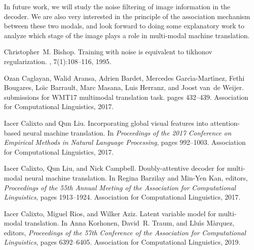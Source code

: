 \documentclass{article}
\begin{document}
In future work, we will study the noise filtering of image information in the decoder. We are also very interested in the principle of the association mechanism between these two modals, and look forward to doing some explanatory work to analyze which stage of the image plays a role in multi-modal machine translation.



\clearpage

\begin{thebibliography}{}

Christopher~M. Bishop.
\newblock Training with noise is equivalent to tikhonov regularization.
, 7(1):108--116, 1995.

Ozan Caglayan, Walid Aransa, Adrien Bardet, Mercedes
  Garc{\'{\i}}a{-}Mart{\'{\i}}nez, Fethi Bougares, Lo{\"{\i}}c Barrault, Marc
  Masana, Luis Herranz, and Joost van~de Weijer.
 submissions for {WMT17} multimodal translation task.
\newblock pages 432--439. Association for Computational Linguistics, 2017.

Iacer Calixto and Qun Liu.
\newblock Incorporating global visual features into attention-based neural
  machine translation.
\newblock In {\em Proceedings of the 2017 Conference on Empirical Methods in
  Natural Language Processing}, pages 992--1003. Association for Computational
  Linguistics, 2017.

Iacer Calixto, Qun Liu, and Nick Campbell.
\newblock Doubly-attentive decoder for multi-modal neural machine translation.
\newblock In Regina Barzilay and Min{-}Yen Kan, editors, {\em Proceedings of
  the 55th Annual Meeting of the Association for Computational Linguistics},
  pages 1913--1924. Association for Computational Linguistics, 2017.

Iacer Calixto, Miguel Rios, and Wilker Aziz.
\newblock Latent variable model for multi-modal translation.
\newblock In Anna Korhonen, David~R. Traum, and Llu{\'{\i}}s M{\`{a}}rquez,
  editors, {\em Proceedings of the 57th Conference of the Association for
  Computational Linguistics}, pages 6392--6405. Association for Computational
  Linguistics, 2019.


\end{thebibliography}
\end{document}
